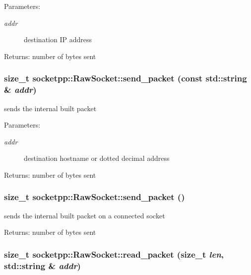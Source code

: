 \begin{Desc}
\item[Parameters:]
\begin{description}
\item[{\em addr}]destination IP address \end{description}
\end{Desc}
\begin{Desc}
\item[Returns:]number of bytes sent \end{Desc}
\hypertarget{classsocketpp_1_1RawSocket_6dfb29dbfedf61d8f082dc1893320d42}{
\subsubsection{\setlength{\rightskip}{0pt plus 5cm}size\_\-t socketpp::RawSocket::send\_\-packet (const std::string \& {\em addr})}}
\label{classsocketpp_1_1RawSocket_6dfb29dbfedf61d8f082dc1893320d42}


sends the internal built packet 

\begin{Desc}
\item[Parameters:]
\begin{description}
\item[{\em addr}]destination hostname or dotted decimal address \end{description}
\end{Desc}
\begin{Desc}
\item[Returns:]number of bytes sent \end{Desc}
\hypertarget{classsocketpp_1_1RawSocket_e987bb77fd3ac6d0e99b5311ff81c1ea}{
\subsubsection{\setlength{\rightskip}{0pt plus 5cm}size\_\-t socketpp::RawSocket::send\_\-packet ()}}
\label{classsocketpp_1_1RawSocket_e987bb77fd3ac6d0e99b5311ff81c1ea}


sends the internal built packet on a connected socket 

\begin{Desc}
\item[Returns:]number of bytes sent \end{Desc}
\hypertarget{classsocketpp_1_1RawSocket_1564181b6422fb3918c419051b34ae2d}{
\subsubsection{\setlength{\rightskip}{0pt plus 5cm}size\_\-t socketpp::RawSocket::read\_\-packet (size\_\-t {\em len}, \/  std::string \& {\em addr})}}
\label{classsocketpp_1_1RawSocket_1564181b6422fb3918c419051b34ae2d}



